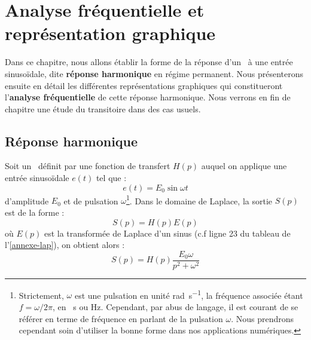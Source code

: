 \chapter[Analyse fréquentielle]{Analyse fréquentielle et représentation graphique\label{chap-anafreq}}


Dans ce chapitre, nous allons établir la forme de la réponse d'un \SLCI~à une entrée sinuso\"idale, dite 
\textbf{réponse harmonique} en régime permanent.
Nous présenterons ensuite en détail les différentes représentations graphiques qui 
constitueront l'\textbf{analyse fréquentielle} de cette réponse harmonique.
Nous verrons en fin de chapitre une étude du transitoire dans des cas usuels.


\section{Réponse harmonique}


Soit un \SLCI~définit par une fonction de transfert $H(p)$ auquel on applique 
une entrée sinuso\"idale $e(t)$ tel que :
$$
e(t)=E_0\sin\omega t 
$$
d'amplitude $E_0$ et de pulsation $\omega$\footnote{Strictement, $\omega$ est une 
pulsation en unité \si{\radian\per\second}, la fréquence associée étant $f=\omega/2\pi$, 
en \si{\per\second} ou \si{\hertz}. Cependant, 
par abus de langage, il est courant de se référer en terme de fréquence en parlant de la pulsation $\omega$. 
Nous prendrons cependant soin d'utiliser la bonne forme dans nos applications numériques.}.
Dans le domaine de Laplace, la sortie $S(p)$ est de la forme :
$$
S(p)=H(p)E(p)
$$
où $E(p)$ est la transformée de Laplace d'un sinus (c.f ligne 23 du tableau de l'\cref{annexe-lap}), 
on obtient alors :
$$
S(p)=H(p)\dfrac{E_0\omega}{p^2+\omega^2}
$$

